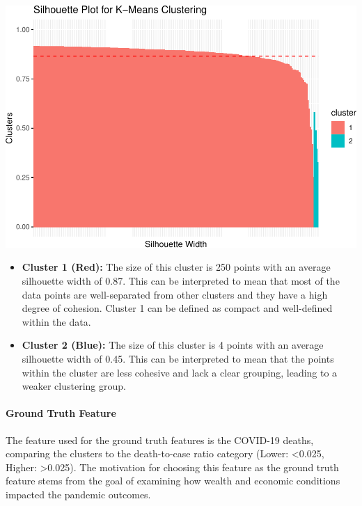 \documentclass[
]{article}
\providecommand{\tightlist}{%
  \setlength{\itemsep}{0pt}\setlength{\parskip}{0pt}}
\begin{document}
\includegraphics{Final-Report_files/figure-latex/heirarchical silhouette plot-1.pdf}


\vspace{10pt}

\begin{itemize}
\tightlist
\item
  \textbf{Cluster 1 (Red):} The size of this cluster is 250 points with
  an average silhouette width of 0.87. This can be interpreted to mean
  that most of the data points are well-separated from other clusters
  and they have a high degree of cohesion. Cluster 1 can be defined as
  compact and well-defined within the data.
\item
  \textbf{Cluster 2 (Blue):} The size of this cluster is 4 points with
  an average silhouette width of 0.45. This can be interpreted to mean
  that the points within the cluster are less cohesive and lack a clear
  grouping, leading to a weaker clustering group.
\end{itemize}

\paragraph{Ground Truth Feature}\label{ground-truth-feature}

The feature used for the ground truth features is the COVID-19 deaths,
comparing the clusters to the death-to-case ratio category (Lower:
\textless0.025, Higher: \textgreater0.025). The motivation for choosing
this feature as the ground truth feature stems from the goal of
examining how wealth and economic conditions impacted the pandemic
outcomes.
\end{document}
